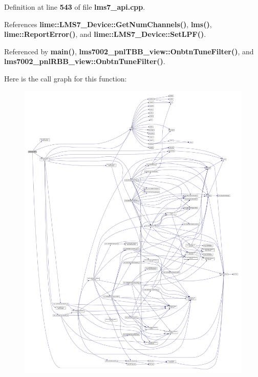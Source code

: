Definition at line {\bf 543} of file {\bf lms7\+\_\+api.\+cpp}.



References {\bf lime\+::\+L\+M\+S7\+\_\+\+Device\+::\+Get\+Num\+Channels()}, {\bf lms()}, {\bf lime\+::\+Report\+Error()}, and {\bf lime\+::\+L\+M\+S7\+\_\+\+Device\+::\+Set\+L\+P\+F()}.



Referenced by {\bf main()}, {\bf lms7002\+\_\+pnl\+T\+B\+B\+\_\+view\+::\+Onbtn\+Tune\+Filter()}, and {\bf lms7002\+\_\+pnl\+R\+B\+B\+\_\+view\+::\+Onbtn\+Tune\+Filter()}.



Here is the call graph for this function\+:
\nopagebreak
\begin{figure}[H]
\begin{center}
\leavevmode
\includegraphics[width=350pt]{df/de1/lms7__api_8cpp_ad7c91857ba6e83bf060e5359420925a7_cgraph}
\end{center}
\end{figure}





